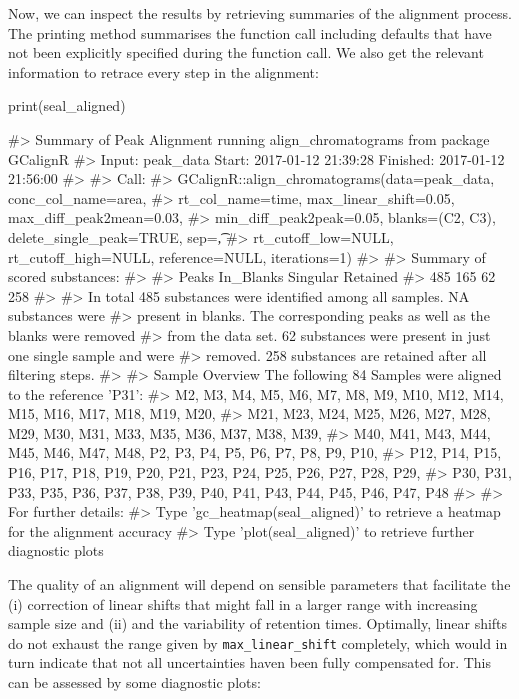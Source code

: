 Now, we can inspect the results by retrieving summaries of the alignment
process. The printing method summarises the function call including
defaults that have not been explicitly specified during the function
call. We also get the relevant information to retrace every step in the
alignment:

\begin{Schunk}
\begin{Sinput}
print(seal_aligned)
\end{Sinput}
\begin{Soutput}
#>   Summary of Peak Alignment running align_chromatograms from package GCalignR
#>   Input: peak_data   Start:  2017-01-12 21:39:28     Finished:  2017-01-12 21:56:00 
#> 
#> Call:
#>   GCalignR::align_chromatograms(data=peak_data, conc_col_name=area,
#>   rt_col_name=time, max_linear_shift=0.05, max_diff_peak2mean=0.03,
#>   min_diff_peak2peak=0.05, blanks=(C2, C3), delete_single_peak=TRUE, sep=\t,
#>   rt_cutoff_low=NULL, rt_cutoff_high=NULL, reference=NULL, iterations=1)
#> 
#> Summary of scored substances:
#> 
#>     Peaks In_Blanks  Singular  Retained 
#>       485       165        62       258 
#> 
#>   In total 485 substances were identified among all samples. NA substances were
#>   present in blanks. The corresponding peaks as well as the blanks were removed
#>   from the data set. 62 substances were present in just one single sample and were
#>   removed. 258 substances are retained after all filtering steps.
#> 
#> Sample Overview  The following 84 Samples were aligned to the reference 'P31':
#>   M2, M3, M4, M5, M6, M7, M8, M9, M10, M12, M14, M15, M16, M17, M18, M19, M20,
#>   M21, M23, M24, M25, M26, M27, M28, M29, M30, M31, M33, M35, M36, M37, M38, M39,
#>   M40, M41, M43, M44, M45, M46, M47, M48, P2, P3, P4, P5, P6, P7, P8, P9, P10,
#>   P12, P14, P15, P16, P17, P18, P19, P20, P21, P23, P24, P25, P26, P27, P28, P29,
#>   P30, P31, P33, P35, P36, P37, P38, P39, P40, P41, P43, P44, P45, P46, P47, P48
#> 
#> For further details:
#>   Type 'gc_heatmap(seal_aligned)' to retrieve a heatmap for the alignment accuracy
#>   Type 'plot(seal_aligned)' to retrieve further diagnostic plots
\end{Soutput}
\end{Schunk}

The quality of an alignment will depend on sensible parameters that
facilitate the (i) correction of linear shifts that might fall in a
larger range with increasing sample size and (ii) and the variability of
retention times. Optimally, linear shifts do not exhaust the range given
by \texttt{max\_linear\_shift} completely, which would in turn indicate
that not all uncertainties haven been fully compensated for. This can be
assessed by some diagnostic plots:

